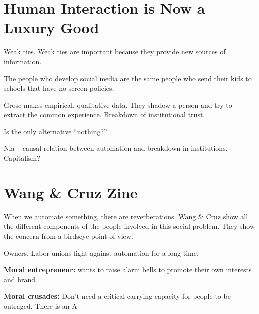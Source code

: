 \section{Human Interaction is Now a Luxury Good}
Weak ties.
Weak ties are important because they provide new sources of information.

The people who develop social media are the same people who send their kids to schools that have no-screen policies.

Grose makes empirical, qualitative data.
They shadow a person and try to extract the common experience.
Breakdown of institutional trust.

Is the only alternative ``nothing?''

Nia -- causal relation between automation and breakdown in institutions.
Capitalism?

\section{Wang \& Cruz Zine}
When we automate something, there are reverberations.
Wang \& Cruz show all the different components of the people involved in this social problem.
They show the concern from a birdseye point of view.

Owners.
Labor unions fight against automation for a long time.

\textbf{Moral entrepreneur:} wants to raise alarm bells to promote their own interests and brand.

\textbf{Moral crusades:} Don't need a critical carrying capacity for people to be outraged.
There is an A
